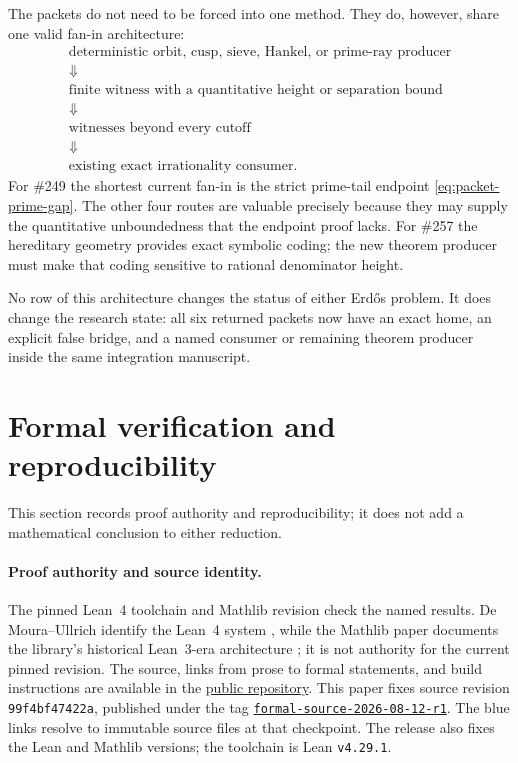 \documentclass[11pt]{article}
\newcommand{\commitshort}{99f4bf47422a}
\theoremstyle{definition}
\theoremstyle{remark}
\begin{document}
The packets do not need to be forced into one method.  They do, however, share
one valid fan-in architecture:
\[
 \begin{array}{c}
 \text{deterministic orbit, cusp, sieve, Hankel, or prime-ray producer}
 \\
 \Downarrow\\[-2pt]
 \text{finite witness with a quantitative height or separation bound}
 \\
 \Downarrow\\[-2pt]
 \text{witnesses beyond every cutoff}
 \\
 \Downarrow\\[-2pt]
 \text{existing exact irrationality consumer.}
 \end{array}
\]
For \#249 the shortest current fan-in is the strict prime-tail endpoint
\eqref{eq:packet-prime-gap}.  The other four routes are valuable precisely
because they may supply the quantitative unboundedness that the endpoint proof
lacks.  For \#257 the hereditary geometry provides exact symbolic coding; the
new theorem producer must make that coding sensitive to rational denominator
height.

No row of this architecture changes the status of either Erd\H{o}s problem.
It does change the research state: all six returned packets now have an exact
home, an explicit false bridge, and a named consumer or remaining theorem
producer inside the same integration manuscript.

\section{Formal verification and reproducibility}\label{sec:verify}

\noindent This section records proof authority and reproducibility; it does
not add a mathematical conclusion to either reduction.

\paragraph{Proof authority and source identity.}
The pinned Lean~4 toolchain and Mathlib revision check the named results.
De Moura--Ullrich identify the Lean~4 system
\cite[abstract and \S1, pp.~625--626]{lean}, while the Mathlib paper documents
the library's historical Lean~3-era architecture
\cite[abstract and \S1.1, p.~367]{mathlib}; it is not authority for the current
pinned revision.  The source, links from prose to formal statements, and build
instructions are available in the
\href{https://github.com/wcook04/plectis-lean-erdos249-257}{public repository}.
This paper fixes source revision \texttt{\commitshort}, published under
the tag
\href{https://github.com/wcook04/plectis-lean-erdos249-257/tree/formal-source-2026-08-12-r1}{\texttt{formal-source-2026-08-12-r1}}.
The blue links resolve to immutable source files at that checkpoint.
The release also fixes the Lean and Mathlib
versions; the toolchain is Lean \texttt{v4.29.1}.
\end{document}
